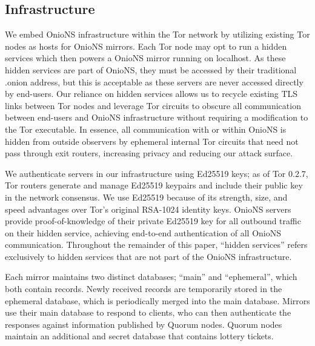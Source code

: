 \documentclass[USenglish,oneside,twocolumn]{article}
\begin{document}

\subsection{Infrastructure}

We embed OnioNS infrastructure within the Tor network by utilizing existing Tor nodes as hosts for OnioNS mirrors. Each Tor node may opt to run a hidden services which then powers a OnioNS mirror running on localhost. As these hidden services are part of OnioNS, they must be accessed by their traditional .onion address, but this is acceptable as these servers are never accessed directly by end-users. Our reliance on hidden services allows us to recycle existing TLS links between Tor nodes and leverage Tor circuits to obscure all communication between end-users and OnioNS infrastructure without requiring a modification to the Tor executable. In essence, all communication with or within OnioNS is hidden from outside observers by ephemeral internal Tor circuits that need not pass through exit routers, increasing privacy and reducing our attack surface.

We authenticate servers in our infrastructure using Ed25519 \cite{bernstein2012high} keys; as of Tor 0.2.7, Tor routers generate and manage Ed25519 keypairs and include their public key in the network consensus. We use Ed25519 because of its strength, size, and speed advantages over Tor's original RSA-1024 identity keys. OnioNS servers provide proof-of-knowledge of their private Ed25519 key for all outbound traffic on their hidden service, achieving end-to-end authentication of all OnioNS communication. Throughout the remainder of this paper, ``hidden services'' refers exclusively to hidden services that are not part of the OnioNS infrastructure.

Each mirror maintains two distinct databases; ``main'' and ``ephemeral'', which both contain records. Newly received records are temporarily stored in the ephemeral database, which is periodically merged into the main database. Mirrors use their main database to respond to clients, who can then authenticate the responses against information published by Quorum nodes. Quorum nodes maintain an additional and secret database that contains lottery tickets.
\end{document}

